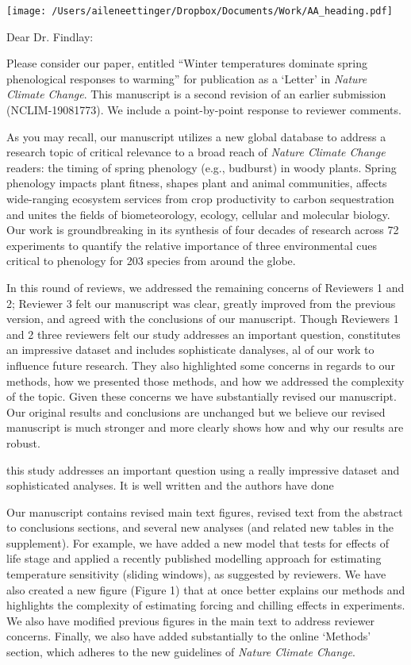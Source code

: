 \documentclass[11.5pt,a4paper]{letter}
\begin{document}
\begin{letter}{}
\texttt{[image: /Users/aileneettinger/Dropbox/Documents/Work/AA\_heading.pdf]}

\opening{Dear Dr. Findlay:}
Please consider our paper, entitled ``Winter temperatures dominate spring phenological responses to warming'' for publication as a `Letter' in \emph{Nature Climate Change}. This manuscript is a second revision of an earlier submission (NCLIM-19081773). We include a point-by-point response to reviewer comments. 

\par As you may recall, our manuscript utilizes a new global database to address a research topic of critical relevance to a broad reach of \emph{Nature Climate Change} readers:  the timing of spring phenology (e.g., budburst) in woody plants. Spring phenology impacts plant fitness, shapes plant and animal communities, affects wide-ranging ecosystem services from crop productivity to carbon sequestration and unites the fields of biometeorology, ecology, cellular and molecular biology. Our work is groundbreaking in its synthesis of four decades of research across 72 experiments to quantify the relative importance of three environmental cues critical to phenology for 203 species from around the globe. 

\par In this round of reviews, we addressed the remaining concerns of Reviewers 1 and 2; Reviewer 3 felt our manuscript was clear, greatly improved from the previous version, and agreed with the conclusions of our manuscript. Though Reviewers 1 and 2 three reviewers felt our study addresses an important question, constitutes an impressive dataset and includes sophisticate danalyses, al of our work to influence future research. They also highlighted some concerns in regards to our methods, how we presented those methods, and how we addressed the complexity of the topic. Given these concerns we have substantially revised our manuscript. Our original results and conclusions are unchanged but we believe our revised manuscript is much stronger and more clearly shows how and why our results are robust.

this study addresses an important question using a really impressive dataset and sophisticated analyses. It is well written and the authors have done

\par Our manuscript contains revised main text figures, revised text from the abstract to conclusions sections, and several new analyses (and related new tables in the supplement). For example, we have added a new model that tests for effects of life stage and applied a recently published modelling approach for estimating temperature sensitivity (sliding windows), as suggested by reviewers. We have also created a new figure (Figure 1) that at once better explains our methods and highlights the complexity of estimating forcing and chilling effects in experiments. We also have modified previous figures in the main text to address reviewer concerns. Finally, we also have added substantially to the online `Methods' section, which adheres to the new guidelines of \emph{Nature Climate Change}. 


\end{letter}
\end{document}
